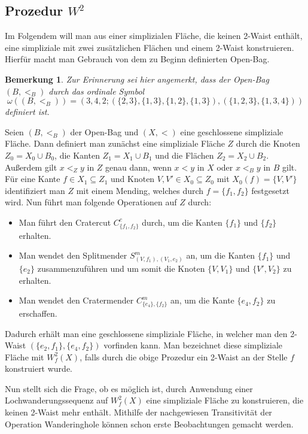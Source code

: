 \documentclass[12pt,titlepage,twoside,cleardoublepage]{article}
\theoremstyle{nummermitklammern}
\newtheorem{bemerkung}[temp]{Bemerkung}
\newtheorem{bemerkung}[zahl]{Bemerkung}
\numberwithin{equation}{section}
\begin{document}
 \subsection{Prozedur $W^2$}
Im Folgendem will man aus einer simplizialen Fläche, die keinen 2-Waist enthält, eine simpliziale mit zwei zusätzlichen Flächen und einem 2-Waist konstruieren. Hierfür macht man Gebrauch von dem zu Beginn definierten Open-Bag.
\begin{bemerkung}
Zur Erinnerung sei hier angemerkt, dass der Open-Bag $(B,<_B)$ durch das ordinale Symbol 
\[
\omega((B,<_B))=(3,4,2;(\{2,3\},\{1,3\},\{1,2\},\{1,3\}),(\{1,2,3\},\{1,3,4\}))
\] definiert ist.
\end{bemerkung}
 
Seien $(B,<_B)$ der Open-Bag und $(X,<)$ eine geschlossene simpliziale Fläche. Dann definiert man zunächst eine simpliziale Fläche $Z$ durch die Knoten $Z_0=X_0 \cup B_0$, die Kanten $Z_1=X_1 \cup B_1$ und die Flächen $Z_2=X_2 \cup B_2$. Außerdem gilt $x<_Z y$ in $Z$ genau dann, wenn $x<y$ in $X$ oder $x<_B y$ in $B$ gilt.\\
Für eine Kante $f\in X_1 \subseteq Z_1$ und Knoten $V,V'\in X_0\subseteq Z_0$ mit $X_0(f)=\{V,V'\}$ identifiziert man $Z$ mit einem Mending, welches durch $f=\{f_1,f_2\}$ festgesetzt wird.
 Nun führt man folgende Operationen auf $Z$ durch:
\begin{itemize}
\item Man führt den Cratercut $C_{\{f_1,f_2\}}^c$ durch, um die Kanten $\{f_1\}$ und $\{f_2\}$ erhalten.
\item Man wendet den Splitmender $S^m_{(V,{f_1}),(V_1,e_2)}$ an, um die Kanten $\{f_1\}$ und $\{e_2\}$ zusammenzuführen und um somit die Knoten $\{V,V_1\}$ und $\{V',V_2\}$ zu erhalten.
\item Man wendet den Cratermender $C_{\{e_4\},\{f_2\}}^m$ an, um die Kante $\{e_4,f_2\}$ zu erschaffen.
\end{itemize}
Dadurch erhält man eine geschlossene simpliziale Fläche, in welcher man den 2-Waist $(\{e_2,f_1\},\{e_4,f_2\})$ vorfinden kann. Man bezeichnet diese simpliziale Fläche mit \emph{$W^2_f(X)$}, falls durch die obige Prozedur ein 2-Waist an der Stelle $f$ konstruiert wurde.

 Nun stellt sich die Frage, ob es möglich ist, durch Anwendung einer Lochwanderungssequenz auf $W^2_f(X)$ eine simpliziale Fläche zu konstruieren, die keinen 2-Waist mehr enthält. Mithilfe der nachgewiesen Transitivität der Operation Wanderinghole können schon erste Beobachtungen gemacht werden.
 
\end{document}
